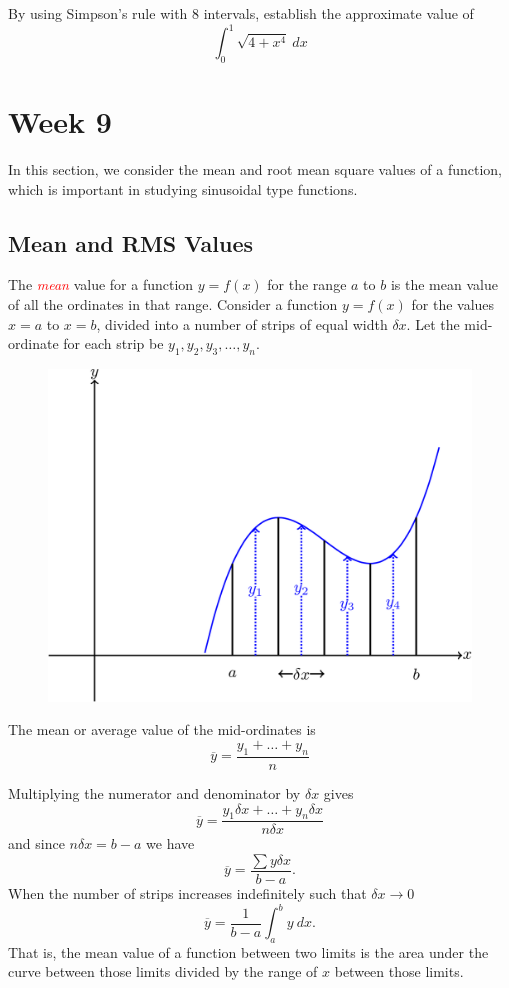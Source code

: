 \documentclass[
  11pt,
  oneside]{book}
\newcommand{\slide}{}
\theoremstyle{definition}
\theoremstyle{definition}
\theoremstyle{definition}
\theoremstyle{definition}
\theoremstyle{remark}
\begin{document}
By using Simpson's rule with 8 intervals, establish the approximate value of
\[
\int_0^1\sqrt{4+x^4}\ dx
\]

\chapter{Week 9}\label{week-nine}

In this section, we consider the mean and root mean square values of a function, which is important in studying sinusoidal type functions.

\slide

\section{Mean and RMS Values}\label{mean-and-rms-values}

The \textcolor{red}{\em mean} value for a function \(y = f(x)\) for the range \(a\) to \(b\) is the mean value of all the ordinates in that range. Consider a function \(y = f(x)\) for the values \(x = a\) to \(x = b\), divided into a number of strips of equal width \(\delta x\). Let the mid-ordinate for each strip be \(y_1, y_2, y_3,\ldots,y_n\).

\begin{figure}

{\centering \includegraphics[width=0.3\linewidth]{tikztopng-figure33} 

}

\end{figure}

The mean or average value of the mid-ordinates is
\[
\overline y=\frac{y_1+\ldots+y_n}{n}
\]
\slide

Multiplying the numerator and denominator by \(\delta x\) gives
\[
\overline y=\frac{y_1\delta x+\ldots+y_n\delta x}{n\delta x}
\]
and since \(n\delta x = b - a\) we have
\[
\overline y = \frac{\sum y\delta x}{b-a}.
\]
When the number of strips increases indefinitely such that \(\delta x \to 0\)
\[
\overline y = \frac{1}{b-a}\int_a^b y\ dx.
\]
That is, the mean value of a function between two limits is the area under the curve between those limits divided by the range of \(x\) between those limits.
\end{document}
